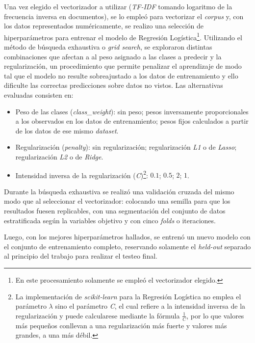Una vez elegido el vectorizador a utilizar (\textit{TF-IDF} tomando
logaritmo de la frecuencia inversa en documentos), se lo emple\'o para
vectorizar el \textit{corpus} y, con los datos representados
num\'ericamente, se realizo una selecci\'on
de hiperpar\'ametros para entrenar el modelo de Regresi\'on Log\'istica\footnote{
En este procesamiento solamente se emple\'o el vectorizador elegido.}.
Utilizando el m\'etodo de b\'usqueda exhaustiva o \textit{grid search}, se
exploraron distintas combinaciones que afectan a
al peso asignado a las clases a predecir y la regularizaci\'on,
un procedimiento que permite penalizar el aprendizaje de modo tal que
el modelo no resulte sobreajustado a los datos de entrenamiento y ello
dificulte las correctas predicciones sobre datos no vistos. Las
alternativas evaluadas consisten en:

\begin{itemize}
    \item Peso de las clases (\textit{class\_weight}): sin peso; pesos
    inversamente proporcionales a los observados en los datos de entrenamiento;
    pesos fijos calculados a partir de los datos de ese mismo \textit{dataset}.    
    \item Regularizaci\'on (\textit{penalty}): sin regularizaci\'on;
    regularizaci\'on \textit{L1}
    o de \textit{Lasso}; regularizaci\'on \textit{L2} o de \textit{Ridge}.
    \item Intensidad inversa de la regularizaci\'on (\textit{C})\footnote{
    La implementaci\'on de \textit{scikit-learn} para la Regresi\'on
    Log\'istica no emplea el par\'ametro $\lambda$ sino el par\'ametro \textit{C},
    el cual refiere a la intensidad inversa de la regularizaci\'on y puede
    calcularese mediante la f\'ormula $\frac{1}{C}$, por lo que valores
    m\'as pequeños conllevan a una regularizaci\'on m\'as fuerte y valores m\'as
    grandes, a una m\'as d\'ebil.}: $0.1$; $0.5$; $2$; $1$.
\end{itemize}

Durante la b\'usqueda exhaustiva se realiz\'o una validaci\'on cruzada del mismo
modo que al seleccionar el vectorizador: colocando una semilla para que los
resultados fuesen replicables, con una segmentaci\'on del conjunto de datos
estratificada seg\'un la variables objetivo y con cinco \textit{folds} o
iteraciones.
\par
Luego, con los mejores hiperpar\'ametros hallados, se entren\'o un nuevo modelo
con el conjunto de entrenamiento completo, reservando solamente el
\textit{held-out} separado al principio del trabajo
para realizar el testeo final.
